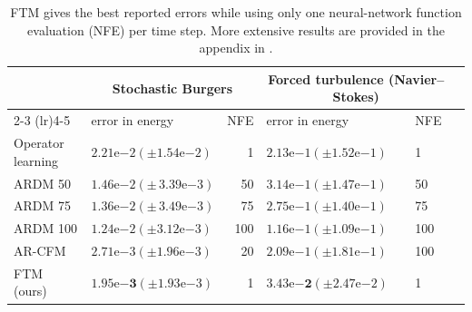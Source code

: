 \documentclass[oneside,11pt]{article}
\theoremstyle{remark}
\begin{document}
\begin{table}
\centering
\caption{FTM gives the best reported errors while using only one neural-network function evaluation (NFE) per time step. More extensive results are provided in the appendix in .}
\label{tab:maintextburgers_jaxcfd}
\setlength{\tabcolsep}{2.5pt}
\newcommand{\pmc}[2]{#1{(\pm#2)}}
\renewcommand{\arraystretch}{0.92}

\small\begin{tabular}{llrllr}
\toprule
 & \multicolumn{2}{c}{Stochastic Burgers}
 & \multicolumn{2}{c}{Forced turbulence (Navier--Stokes)} \\
\cmidrule(lr){2-3} \cmidrule(lr){4-5}
 & error in energy & NFE & error in energy & NFE \\
\midrule

Operator learning \cite{stachenfeld2021learned}
& $\pmc{2.21\mathrm{e}{-2}}{1.54\mathrm{e}{-2}}$
& 1
& $\pmc{2.13\mathrm{e}{-1}}{1.52\mathrm{e}{-1}}$
& 1 \\







ARDM 50 \cite{KOHL2026108641}
& $1.46\mathrm{e}{-2}(\pm\,3.39\mathrm{e}{-3})$
& 50
& $\pmc{3.14\mathrm{e}{-1}}{1.47\mathrm{e}{-1}}$ 
& 50 \\

ARDM 75 \cite{KOHL2026108641}
& $1.36\mathrm{e}{-2}(\pm\,3.49\mathrm{e}{-3})$
& 75
& $\pmc{2.75\mathrm{e}{-1}}{1.40\mathrm{e}{-1}}$  
& 75 \\

ARDM 100 \cite{KOHL2026108641}
& $\pmc{1.24\mathrm{e}{-2}}{3.12\mathrm{e}{-3}}$
& 100
& $\pmc{1.16\mathrm{e}{-1}}{1.09\mathrm{e}{-1}}$
& 100 \\

AR-CFM \cite{albergo-vanden-eijnden:2022,lipman2023flow}
& $\pmc{2.71\mathrm{e}{-3}}{1.96\mathrm{e}{-3}}$
& 20
& $\pmc{2.09\mathrm{e}{-1}}{1.81\mathrm{e}{-1}}$
& 100 \\













FTM (ours)
& $\pmc{\mathbf{1.95\mathrm{e}{-3}}}{1.93\mathrm{e}{-3}}$
& 1
& $\pmc{\mathbf{3.43\mathrm{e}{-2}}}{2.47\mathrm{e}{-2}}$
& 1 \\

\bottomrule
\end{tabular}%

\end{table}
\end{document}
